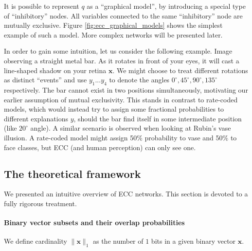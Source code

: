 \documentclass[12pt]{article}
\begin{document}
It is possible to represent $q$ as a ``graphical model'', by introducing a special type of ``inhibitory'' nodes. All variables connected to the same ``inhibitory'' node are mutually exclusive. Figure \ref{fig:ecc_graphical_models} shows the simplest example of such a model. More complex networks will be presented later.

In order to gain some intuition, let us consider the following example. Image observing a straight metal bar. As it rotates in front of your eyes, it will cast a line-shaped shadow on your retina $\boldsymbol{x}$. We might choose to treat different  rotations as distinct ``events'' and use $y_1...y_4$ to denote the angles $0^{\circ},45^{\circ},90^{\circ},135^{\circ}$ respectively. The bar cannot exist in two positions simultaneously, motivating our earlier assumption of mutual exclusivity. This stands in contrast to rate-coded models, which would instead try to assign some fractional probabilities to different explanations $y$, should the bar find itself in some intermediate position (like $20^\circ$ angle). A similar scenario is observed when looking at Rubin's vase illusion. A rate-coded model might assign 50\% probability to vase and 50\% to face classes, but ECC (and human perception) can only see one.

\subsection{The theoretical framework}
We presented an intuitive overview of ECC networks. This section is devoted to a fully rigorous treatment.

\paragraph{Binary vector subsets and their overlap probabilities} 

We define cardinality $\lVert\boldsymbol{x}\rVert_1$ as the number of $1$ bits in a given binary vector $\boldsymbol{x}$.
\end{document}
